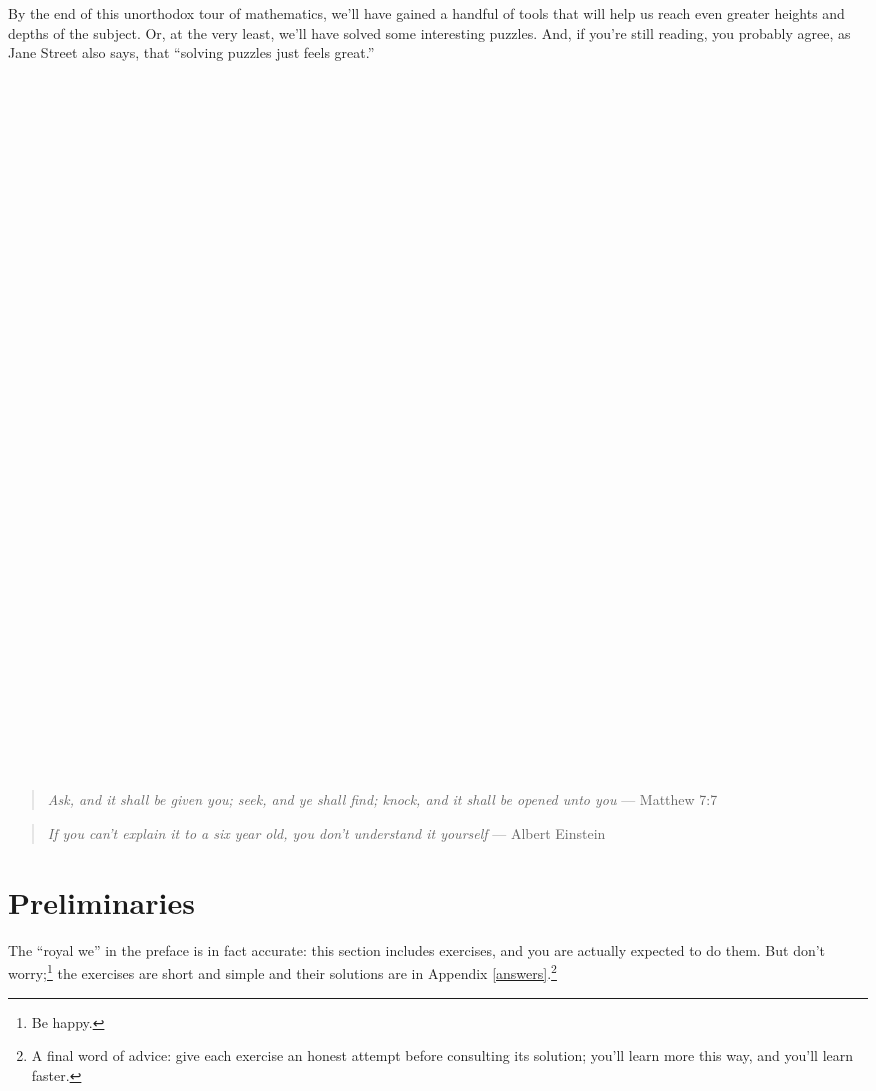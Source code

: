 \documentclass{book}
\theoremstyle{definition}
\theoremstyle{colonstylebf}
\begin{document}
By the end of this unorthodox tour of mathematics, we'll have gained a handful of tools that will help us reach even greater heights and depths of the subject. Or, at the very least, we'll have solved some interesting puzzles. And, if you're still reading, you probably agree, as Jane Street also says, that ``solving puzzles just feels great.''

\newpage

$\phantom{\scalebox{72}{A}}$

\begin{flushright}
\begin{quote}
\emph{Ask, and it shall be given you; seek, and ye shall find; knock, and it shall be opened unto you} --- Matthew 7:7
\end{quote}
\begin{quote}
\emph{If you can't explain it to a six year old, you don't understand it yourself} --- Albert Einstein
\end{quote}
\end{flushright}

\chapter{Preliminaries}\label{prelim}
The ``royal we'' in the preface is in fact accurate: this section includes exercises, and you are actually expected to do them. But don't worry;\footnote{Be happy.} the exercises are short and simple and their solutions are in Appendix \ref{answers}.\footnote{A final word of advice: give each exercise an honest attempt before consulting its solution; you'll learn more this way, and you'll learn faster.} 

\end{document}
